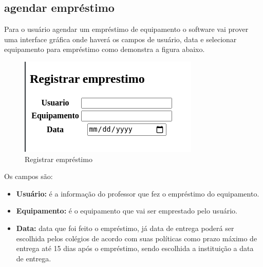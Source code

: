 \documentclass[
12pt,				%
oneside,			%
a4paper,			%
section=TITLE,
brazil,				%
]{abntex2}
\begin{document}

  



  \subsection{agendar empréstimo}

  Para o usuário agendar um empréstimo de equipamento o software vai prover uma
  interface gráfica onde haverá os campos de usuário, data e selecionar
  equipamento para empréstimo como demonstra a figura abaixo.

  \begin{figure}[htb]
    \caption{\label{}Registrar empréstimo}
    \begin{center}
      \includegraphics[scale=1.10]{./img/agendar.png}
    \end{center}
  \end{figure}

  Os campos são:\\

  \begin{itemize}
    \item \textbf{Usuário:} é a  informação do professor que fez o empréstimo do
      equipamento.

    \item \textbf{Equipamento:} é o equipamento que vai ser emprestado pelo
      usuário.

      \item \textbf{Data:} data que foi feito o empréstimo, já data de entrega
      poderá ser escolhida pelos colégios de acordo com suas políticas como prazo
      máximo de entrega até 15 dias após o empréstimo, sendo escolhida a
      instituição a data de entrega.
  \end{itemize}
\end{document}

